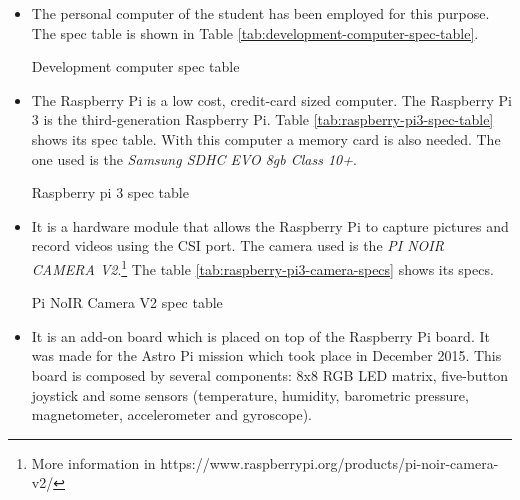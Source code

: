 \begin{itemize}
	\item {} The personal computer of the student has been employed for this purpose. The spec table is shown in Table \ref{tab:development-computer-spec-table}.
	
	\begin{table}[!h]
		\centering
		{\small
			
		}
		\caption{Development computer spec table}
		\label{tab:development-computer-spec-table}
	\end{table}
	
	\item {} The Raspberry Pi is a low cost, credit-card sized computer. The Raspberry Pi 3 is the third-generation Raspberry Pi. Table \ref{tab:raspberry-pi3-spec-table} shows its spec table. With this computer a memory card is also needed. The one used is the \emph{Samsung SDHC EVO 8gb Class 10+}.
	
	\begin{table}[!h]
		\centering
		{\small
			
		}
		\caption{Raspberry pi 3 spec table}
		\label{tab:raspberry-pi3-spec-table}
	\end{table}
	
	\item {} It is a hardware module that allows the Raspberry Pi to capture pictures and record videos using the CSI port. The camera used is the \emph{PI NOIR CAMERA V2}.\footnote{More information in https://www.raspberrypi.org/products/pi-noir-camera-v2/} The table \ref{tab:raspberry-pi3-camera-specs} shows its specs. \label{itm:Pi-camera-module-v2}
	
	\begin{table}[!h]
		\centering
		{\small
			
		}
		\caption{Pi NoIR Camera V2 spec table}
		\label{tab:raspberry-pi3-camera-specs}
	\end{table}

	\item {} It is an add-on board which is placed on top of the Raspberry Pi board. It was made for the Astro Pi mission which took place in December 2015. This board is composed by several components: 8x8 RGB LED matrix, five-button joystick and some sensors (temperature, humidity, barometric pressure, magnetometer, accelerometer and gyroscope).
	

\end{itemize}
